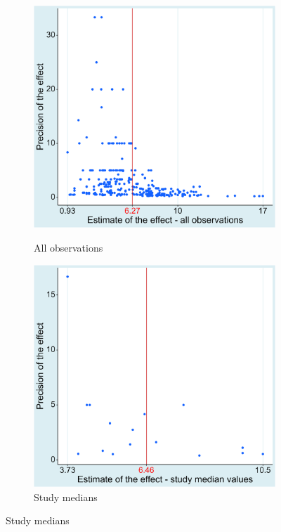 \begin{figure}[!htbp]
  \begin{center}
    \caption{The twin studies funnel plot}
    \label{fig:funnel_plot_twins}
    \begin{subfigure}[b]{0.45\textwidth}
      \caption{All observations}
      \includegraphics[width=0.95\linewidth]{Figures/funnel_twins.png}
      \label{fig:funnel_plot_twins_all}
    \end{subfigure}
    \begin{subfigure}[b]{0.45\textwidth}
      \caption{Study medians}
      \includegraphics[width=0.95\linewidth]{Figures/funnel_twins_medians.png}

\end{subfigure}
\end{center}
\end{figure}

